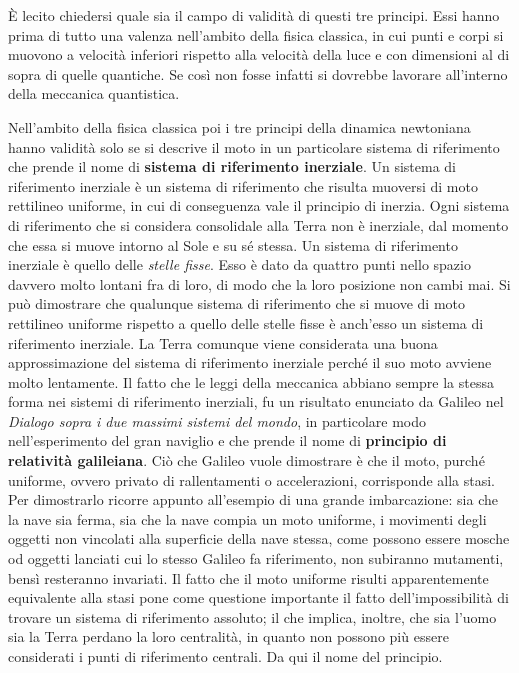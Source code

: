 È lecito chiedersi quale sia il campo di validità di questi tre principi. Essi hanno prima di tutto una valenza nell'ambito della fisica classica, in cui punti e corpi si muovono a velocità inferiori rispetto alla velocità della luce e con dimensioni al di sopra di quelle quantiche. Se così non fosse infatti si dovrebbe lavorare all'interno della meccanica quantistica.

Nell'ambito della fisica classica poi i tre principi della dinamica newtoniana hanno validità solo se si descrive il moto in un particolare sistema di riferimento che prende il nome di \textbf{sistema di riferimento inerziale}.
Un sistema di riferimento inerziale è un sistema di riferimento che risulta muoversi di moto rettilineo uniforme, in cui di conseguenza vale il principio di inerzia.
Ogni sistema di riferimento che si considera consolidale alla Terra non è inerziale, dal momento che essa si muove intorno al Sole e su sé stessa. Un sistema di riferimento inerziale è quello delle \emph{stelle fisse}. Esso è dato da quattro punti nello spazio davvero molto lontani fra di loro, di modo che la loro posizione non cambi mai. Si può dimostrare che qualunque sistema di riferimento che si muove di moto rettilineo uniforme rispetto a quello delle stelle fisse è anch'esso un sistema di riferimento inerziale.
La Terra comunque viene considerata una buona approssimazione del sistema di riferimento inerziale perché il suo moto avviene molto lentamente.
Il fatto che le leggi della meccanica abbiano sempre la stessa forma nei sistemi di riferimento inerziali, fu un risultato enunciato da Galileo nel \textit{Dialogo sopra i due massimi sistemi del mondo}, in particolare modo nell'esperimento del gran naviglio e che prende il nome di \textbf{principio di relatività galileiana}. Ciò che Galileo vuole dimostrare è che il moto, purché uniforme, ovvero privato di rallentamenti o accelerazioni, corrisponde alla stasi. Per dimostrarlo ricorre appunto all'esempio di una grande imbarcazione: sia che la nave sia ferma, sia che la nave compia un moto uniforme, i movimenti degli oggetti non vincolati alla superficie della nave stessa, come possono essere mosche od oggetti lanciati cui lo stesso Galileo fa riferimento, non subiranno mutamenti, bensì resteranno invariati.
Il fatto che il moto uniforme risulti apparentemente equivalente alla stasi pone come questione importante il fatto dell'impossibilità di trovare un sistema di riferimento assoluto; il che implica, inoltre, che sia l'uomo sia la Terra perdano la loro centralità, in quanto non possono più essere considerati i punti di riferimento centrali. Da qui il nome del principio.

